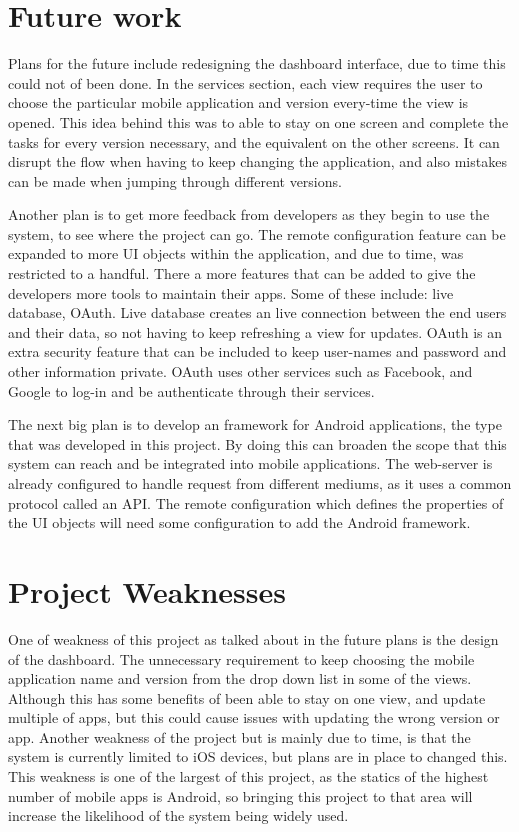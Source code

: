 \section{Future work}

Plans for the future include redesigning the dashboard interface, due to time this could not of been done. In the services section, each view requires the user to choose the particular mobile application and version every-time the view is opened. This idea behind this was to able to stay on one screen and complete the tasks for every version necessary, and the equivalent on the other screens. It can disrupt the flow when having to keep changing the application, and also mistakes can be made when jumping through different versions.

Another plan is to get more feedback from developers as they begin to use the system, to see where the project can go. The remote configuration feature can be expanded to more UI objects within the application, and due to time, was restricted to a handful. There a more features that can be added to give the developers more tools to maintain their apps. Some of these include: live database, OAuth. Live database creates an live connection between the end users and their data, so not having to keep refreshing a view for updates. OAuth is an extra security feature that can be included to keep user-names and password and other information private. OAuth uses other services such as Facebook, and Google to log-in and be authenticate through their services. 

The next big plan is to develop an framework for Android applications, the type that was developed in this project. By doing this can broaden the scope that this system can reach and be integrated into mobile applications. The web-server is already configured to handle request from different mediums, as it uses a common protocol called an API. The remote configuration which defines the properties of the UI objects will need some configuration to add the Android framework. 

\section{Project Weaknesses}

One of weakness of this project as talked about in the future plans is the design of the dashboard. The unnecessary requirement to keep choosing the mobile application name and version from the drop down list in some of the views. Although this has some benefits of been able to stay on one view, and update multiple of apps, but this could cause issues with updating the wrong version or app. Another weakness of the project but is mainly due to time, is that the system is currently limited to iOS devices, but plans are in place to changed this. This weakness is one of the largest of this project, as the statics of the highest number of mobile apps is Android, so bringing this project to that area will increase the likelihood of the system being widely used. 

